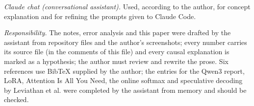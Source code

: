 \documentclass[conference]{IEEEtran}
\begin{document}
\emph{Claude chat (conversational assistant).} Used, according to the author, for concept explanation and for refining the prompts given to Claude Code.

\emph{Responsibility.} The notes, error analysis and this paper were drafted by the assistant from repository files and the author's screenshots; every number carries its source file (in the comments of this file) and every causal explanation is marked as a hypothesis; the author must review and rewrite the prose. Six references use BibTeX supplied by the author; the entries for the Qwen3 report, LoRA, Attention Is All You Need, the online softmax and speculative decoding by Leviathan et al. were completed by the assistant from memory and should be checked.



\end{document}
